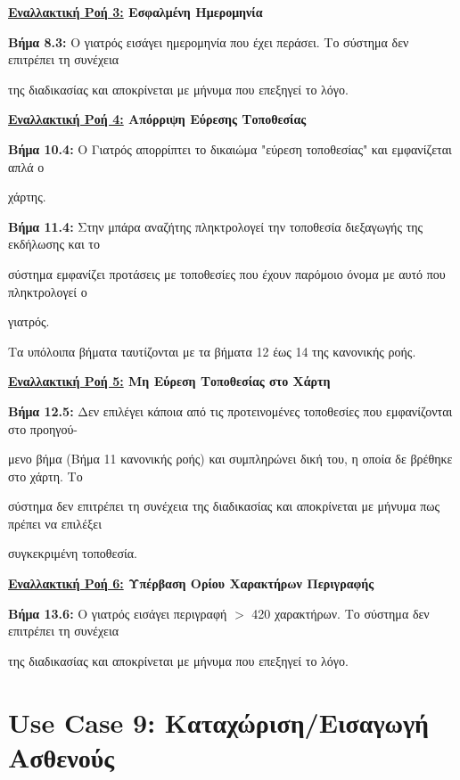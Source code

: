 \documentclass{article}
\begin{document}
\textbf{\underline{Εναλλακτική Ροή 3:} Εσφαλμένη Ημερομηνία} \vspace{0.2cm}
\par \textbf{Βήμα 8.3:} Ο γιατρός εισάγει ημερομηνία που έχει περάσει. Το σύστημα δεν επιτρέπει τη συνέχεια \par της διαδικασίας και αποκρίνεται με μήνυμα που επεξηγεί το λόγο. 

\textbf{\underline{Εναλλακτική Ροή 4:} Απόρριψη Εύρεσης Τοποθεσίας} \vspace{0.2cm}
\par \textbf{Βήμα 10.4:} Ο Γιατρός απορρίπτει το δικαιώμα "εύρεση τοποθεσίας" και εμφανίζεται απλά ο \par χάρτης. \vspace{0.1cm}
\par \textbf{Βήμα 11.4:} Στην μπάρα αναζήτης πληκτρολογεί την τοποθεσία διεξαγωγής της εκδήλωσης και το \par σύστημα εμφανίζει προτάσεις με τοποθεσίες που έχουν παρόμοιο όνομα με αυτό που πληκτρολογεί ο \par γιατρός. \vspace{0.1cm}

Τα υπόλοιπα βήματα ταυτίζονται με τα βήματα 12 έως 14 της κανονικής ροής. \vspace{0.2cm}

\textbf{\underline{Εναλλακτική Ροή 5:} Μη Εύρεση Τοποθεσίας στο Χάρτη} \vspace{0.2cm}
\par \textbf{Βήμα 12.5:} Δεν επιλέγει κάποια από τις προτεινομένες τοποθεσίες που εμφανίζονται στο προηγού- \par μενο βήμα (Βήμα 11 κανονικής ροής) και συμπληρώνει δική του, η οποία δε βρέθηκε στο χάρτη. Το \par σύστημα δεν επιτρέπει τη συνέχεια της διαδικασίας και αποκρίνεται με μήνυμα πως πρέπει να επιλέξει \par συγκεκριμένη τοποθεσία. \vspace{0.2cm}

\textbf{\underline{Εναλλακτική Ροή 6:} Υπέρβαση Ορίου Χαρακτήρων Περιγραφής} \vspace{0.2cm}
\par \textbf{Βήμα 13.6:} Ο γιατρός εισάγει περιγραφή $>$ 420 χαρακτήρων. Το σύστημα δεν επιτρέπει τη συνέχεια \par της διαδικασίας και αποκρίνεται με μήνυμα που επεξηγεί το λόγο.

\section{Use Case 9: Καταχώριση/Εισαγωγή Ασθενούς}
\end{document}
